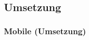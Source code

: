\documentclass[aspectratio=43]{beamer}
\begin{document}
\subsection{Umsetzung}
\begin{frame}
	\frametitle{Mobile (Umsetzung)}
	\begin{columns}

\end{columns}
\end{frame}
\end{document}
